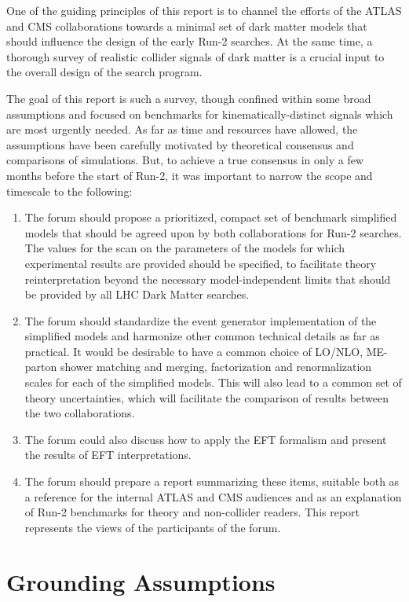 One of the guiding principles of this report is to channel the efforts
of the ATLAS and CMS collaborations towards a minimal set of dark
matter models that should influence the design of the early Run-2
searches. At the same time, a thorough survey of realistic collider
signals of dark matter is a crucial input to the overall design of the
search program.

The goal of this report is such a survey, though confined within some
broad assumptions and focused on benchmarks for kinematically-distinct
signals which are most urgently needed. As far as time and resources
have allowed, the assumptions have been carefully motivated by
theoretical consensus and comparisons of simulations. But, to achieve a
true consensus in only a few months before the start of Run-2, it was
important to narrow the scope and timescale to the following:

\begin{enumerate}
\item The forum should propose a prioritized, compact set of benchmark
  simplified models that should be agreed upon by both collaborations for
  Run-2 searches. The values for the scan on the parameters of the models for which
  experimental results are provided should be specified, to facilitate theory reinterpretation 
  beyond the necessary model-independent limits that 
  should be provided by all LHC Dark Matter searches. 
\item The forum should standardize the event generator implementation
  of the simplified models and harmonize other common technical
  details as far as practical. It
  would be desirable to have a common choice of LO/NLO, ME-parton
  shower matching and merging, factorization and renormalization
  scales for each of the simplified models. This will also lead to a
  common set of theory uncertainties, which will facilitate the
  comparison of results between the two collaborations.
\item The forum could also discuss how to apply the
  EFT formalism and present the results of EFT
  interpretations.
\item The forum should prepare a report summarizing these items,
  suitable both as a reference for the internal ATLAS and CMS
  audiences and as an explanation of Run-2 benchmarks for theory and non-collider
  readers. This report represents the views of the participants of the
  forum.
\end{enumerate}

\section{Grounding Assumptions}

